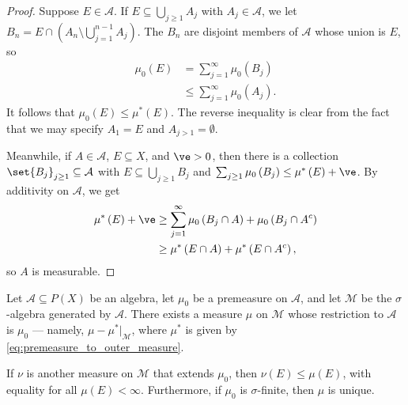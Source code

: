 \documentclass[10pt]{mypackage}
\begin{document}
\begin{proof}
  Suppose $E\in \mathcal{A}$. If $E\subseteq \bigcup_{j\geq 1}A_j$ with $A_j\in \mathcal{A}$, we let $B_n = E\cap \left( A_n\setminus \bigcup_{j=1}^{n-1}A_j \right)$. The $B_n$ are disjoint members of $\mathcal{A}$ whose union is $E$, so
  \begin{align*}
    \mu_0\left( E \right) &= \sum_{j=1}^{\infty}\mu_0\left( B_j \right)\\
                          &\leq \sum_{j=1}^{\infty}\mu_0\left( A_j \right).
  \end{align*}
  It follows that $\mu_0\left( E \right)\leq \mu^{\ast}\left( E \right)$. The reverse inequality is clear from the fact that we may specify $A_1 = E$ and $A_{j >1} = \emptyset$.\newline

  Meanwhile, if $A\in \mathcal{A}$, $E\subseteq X$, and $\ve > 0$, then there is a collection $\set{B_j}_{j\geq 1}\subseteq \mathcal{A}$ with $E\subseteq \bigcup_{j\geq 1}B_j$ and $\sum_{j\geq 1}\mu_0\left( B_j \right)\leq \mu^{\ast}\left( E \right) + \ve$. By additivity on $\mathcal{A}$, we get
  \begin{align*}
    \mu^{\ast}\left( E \right) + \ve &\geq \sum_{j=1}^{\infty}\mu_0\left( B_j\cap A \right) + \mu_0\left( B_j\cap A^{c} \right)\\
                                     &\geq \mu^{\ast}\left( E\cap A \right) + \mu^{\ast}\left( E\cap A^{c} \right),
  \end{align*}
  so $A$ is measurable.
\end{proof}
\begin{theorem}
  Let $\mathcal{A}\subseteq P(X)$ be an algebra, let $\mu_0$ be a premeasure on $\mathcal{A}$, and let $\mathcal{M}$ be the $\sigma$-algebra generated by $\mathcal{A}$. There exists a measure $\mu$ on $\mathcal{M}$ whose restriction to $\mathcal{A}$ is $\mu_0$ --- namely, $\mu - \mu^{\ast}|_{\mathcal{M}}$, where $\mu^{\ast}$ is given by \eqref{eq:premeasure_to_outer_measure}.\newline

  If $\nu$ is another measure on $\mathcal{M}$ that extends $\mu_0$, then $\nu\left( E \right)\leq \mu\left( E \right)$, with equality for all $\mu\left( E \right) < \infty$. Furthermore, if $\mu_0$ is $\sigma$-finite, then $\mu$ is unique.
\end{theorem}
\end{document}
